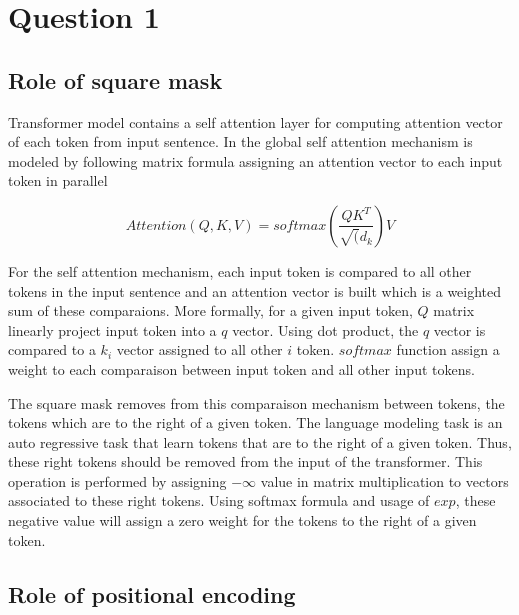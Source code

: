 \documentclass[a4paper]{article}
\begin{document}



\section{Question 1}

\subsection{Role of square mask}

Transformer model contains a self attention layer for computing attention vector of each token from input sentence. In \citep{Vaswani2017} the global self attention mechanism is modeled by following matrix formula assigning an attention vector to each input token in parallel

\begin{equation}
Attention(Q,K,V) = softmax(\frac{QK^{T}}{\sqrt(d_{k}})V
\end{equation}

For the self attention mechanism, each input token is compared to all other tokens in the input sentence and an attention vector is built which is a weighted sum of these comparaions. More formally, for a given input token, $Q$ matrix linearly project input token into a $q$ vector. Using dot product, the $q$ vector is compared to a $k_{i}$ vector assigned to all other $i$ token. $softmax$ function assign a weight to each comparaison between input token and all other input tokens.

The square mask removes from this comparaison mechanism between tokens, the tokens which are to the right of a given token. The language modeling task is an auto regressive task that learn tokens that are to the right of a given token. Thus, these right tokens should be removed from the input of the transformer. This operation is performed by assigning $-\infty$ value in matrix multiplication to vectors associated to these right tokens. Using softmax formula and usage of $exp$, these negative value will assign a zero weight for the tokens to the right of a given token.

\subsection{Role of positional encoding}
\end{document}

